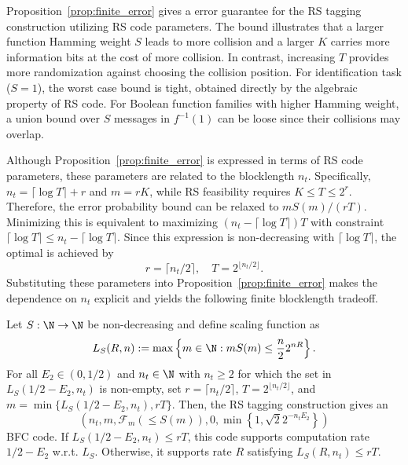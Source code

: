 Proposition~\ref{prop:finite_error} gives a error guarantee for the RS tagging construction utilizing RS code parameters. The bound illustrates that a larger function Hamming weight $S$ leads to more collision and a larger $K$ carries more information bits at the cost of more collision. In contrast, increasing $T$ provides more randomization against choosing the collision position. For identification task ($S=1$), the worst case bound is tight, obtained directly by the algebraic property of RS code. For Boolean function families with higher Hamming weight, a union bound over $S$ messages in $f^{-1}(1)$ can be loose since their collisions may overlap.

Although Proposition~\ref{prop:finite_error} is expressed in terms of RS code parameters, these parameters are related to the blocklength $n_t$. Specifically, $n_t=\lceil\log T\rceil + r$ and $m=rK$, while RS feasibility requires $K\leq T\leq 2^r$.
Therefore, the error probability bound can be relaxed to $mS(m)/(rT)$. Minimizing this is equivalent to maximizing $(n_t-\lceil \log T\rceil)T$ with constraint $\lceil \log T\rceil\leq n_t-\lceil \log T\rceil$. Since this expression is non-decreasing with $\lceil \log T\rceil$, the optimal is achieved by
\begin{equation}
    r=\lceil n_t/2\rceil,\quad T=2^{\lfloor n_t/2\rfloor}.
\end{equation}
Substituting these parameters into Proposition~\ref{prop:finite_error} makes the dependence on $n_t$ explicit and yields the following finite blocklength tradeoff.

\begin{theorem}
    \label{thm:finite_E2}
    Let $S:\N\to\N$ be non-decreasing and define scaling function as
    \begin{equation}
        \label{equ:scaling_function}
        L_S(R,n):=\max\left\{m\in\N:mS(m)\leq\frac{n}{2}2^{nR}\right\}.
    \end{equation}
    For all $E_2\in(0,1/2)$ and $n_t\in\N$ with $n_t\geq 2$ for which the set in $L_S(1/2-E_2,n_t)$ is non-empty, set $r=\lceil n_t/2\rceil$, $T=2^{\lfloor n_t/2\rfloor}$, and $m=\min\{L_S(1/2-E_2,n_t),rT\}$. Then, the RS tagging construction gives an
    \begin{equation}
        \left(n_t, m, \mathcal{F}_m(\leq S(m)), 0, \min\left\{1,\sqrt{2}2^{-n_tE_2}\right\}\right)
    \end{equation}
    BFC code. If $L_S(1/2-E_2,n_t)\leq rT$, this code supports computation rate $1/2-E_2$ w.r.t. $L_S$. Otherwise, it supports rate $R$ satisfying $L_S(R,n_t)\leq rT$.
\end{theorem}


